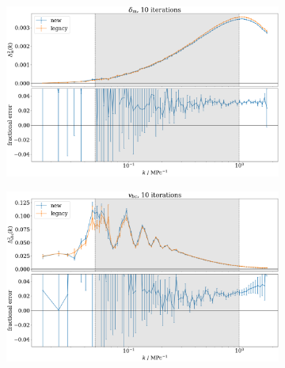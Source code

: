 \documentclass[floats,floatfix,showpacs,amssymb,prd,superscriptaddress,nofootinbib, 11pt]{revtex4-2} %
\begin{document}
\newpage
\newpage
\begin{figure}[H]
     \centering
     \begin{subfigure}[b]{0.8\textwidth}
         \centering
         \includegraphics[width=\textwidth]{images/ic_power_spectra/compare_generators_averaged_power_spectra_with_residual_delta_m.png}
         \label{fig:compare_generators_power_spectrum_delta_m}
     \end{subfigure}
     \hfill
     \begin{subfigure}[b]{0.8\textwidth}
         \centering
         \includegraphics[width=\textwidth]{images/ic_power_spectra/compare_generators_averaged_power_spectra_with_residual_v_bc.png}
         \label{fig:compare_generators_power_spectrum_vbc}
     \end{subfigure}

\end{figure}
\end{document}
